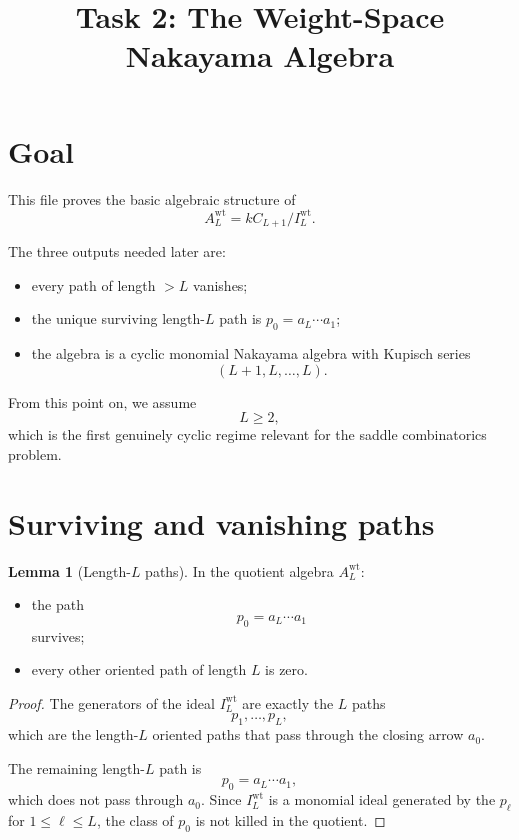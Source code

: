 \documentclass{article}
\title{Task 2: The Weight-Space Nakayama Algebra}
\date{}
\theoremstyle{definition}
\newtheorem{lemma}[theorem]{Lemma}
\begin{document}
\maketitle

\section{Goal}

This file proves the basic algebraic structure of
\[
A_L^{\mathrm{wt}}=kC_{L+1}/I_L^{\mathrm{wt}}.
\]

The three outputs needed later are:

\begin{itemize}
\item every path of length $>L$ vanishes;
\item the unique surviving length-$L$ path is $p_0=a_L\cdots a_1$;
\item the algebra is a cyclic monomial Nakayama algebra with Kupisch series
  \[
  (L+1,L,\dots,L).
  \]
\end{itemize}

From this point on, we assume
\[
L\ge 2,
\]
which is the first genuinely cyclic regime relevant for the saddle
combinatorics problem.

\section{Surviving and vanishing paths}

\begin{lemma}[Length-$L$ paths]
In the quotient algebra $A_L^{\mathrm{wt}}$:

\begin{itemize}
\item the path
  \[
  p_0=a_L\cdots a_1
  \]
  survives;
\item every other oriented path of length $L$ is zero.
\end{itemize}
\end{lemma}

\begin{proof}
The generators of the ideal $I_L^{\mathrm{wt}}$ are exactly the $L$ paths
\[
p_1,\dots,p_L,
\]
which are the length-$L$ oriented paths that pass through the closing arrow
$a_0$.

The remaining length-$L$ path is
\[
p_0=a_L\cdots a_1,
\]
which does not pass through $a_0$.
Since $I_L^{\mathrm{wt}}$ is a monomial ideal generated by the $p_\ell$ for
$1\le \ell\le L$, the class of $p_0$ is not killed in the quotient.
\end{proof}
\end{document}
